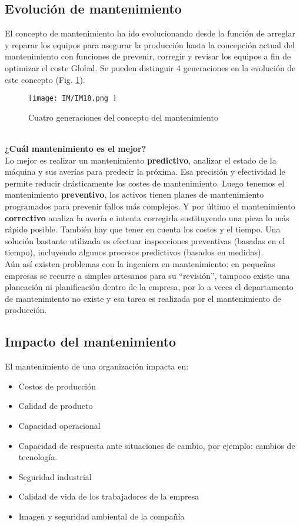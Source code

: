 \documentclass[
	12pt, %
	fleqn, %
	a4paper, %
]{LegrandOrangeBook}
\begin{document}
\subsection{Evolución de mantenimiento}
El concepto de mantenimiento ha ido evolucionando desde la función de arreglar y reparar los equipos para asegurar la producción hasta la concepción actual del mantenimiento con funciones de prevenir, corregir y revisar los equipos a fin de optimizar el coste Global. Se pueden distinguir 4 generaciones en la evolución de este concepto (Fig. \ref{fig:generacion mant}).
\begin{figure}[]
\centering
\texttt{[image: IM/IM18.png ]}
\caption{Cuatro generaciones del concepto del mantenimiento}
\label{fig:generacion mant}
\end{figure}\\
\textbf{¿Cuál mantenimiento es el mejor?}\\
Lo mejor es realizar un mantenimiento \textbf{predictivo}, analizar el estado de la máquina y sus averías para predecir la próxima. Esa precisión y efectividad le permite reducir drásticamente los costes de mantenimiento. Luego tenemos el mantenimiento \textbf{preventivo}, los activos tienen planes de mantenimiento programados para prevenir fallos más complejos. Y por último el mantenimiento \textbf{correctivo} analiza la avería e intenta corregirla sustituyendo una pieza lo más rápido posible. También hay que tener en cuenta los costes y el tiempo. Una solución bastante utilizada es efectuar inspecciones preventivas (basadas en el tiempo), incluyendo algunos procesos predictivos (basados en medidas).\\
Aún así existen problemas con la ingeniera en mantenimiento: en pequeñas empresas se recurre a simples artesanos para su ``revisión'', tampoco existe una planeación ni planificación dentro de la empresa, por lo a veces el departamento de mantenimiento no existe y esa tarea es realizada por el mantenimiento de producción.
\subsection{Impacto del mantenimiento}
El mantenimiento de una organización impacta en:
\begin{itemize}
\item Costos de producción
\item Calidad de producto
\item Capacidad operacional
\item Capacidad de respuesta ante situaciones de cambio, por ejemplo: cambios de tecnología.
\item Seguridad industrial
\item Calidad de vida de los trabajadores de la empresa
\item Imagen y seguridad ambiental de la compañía
\end{itemize}
\end{document}
